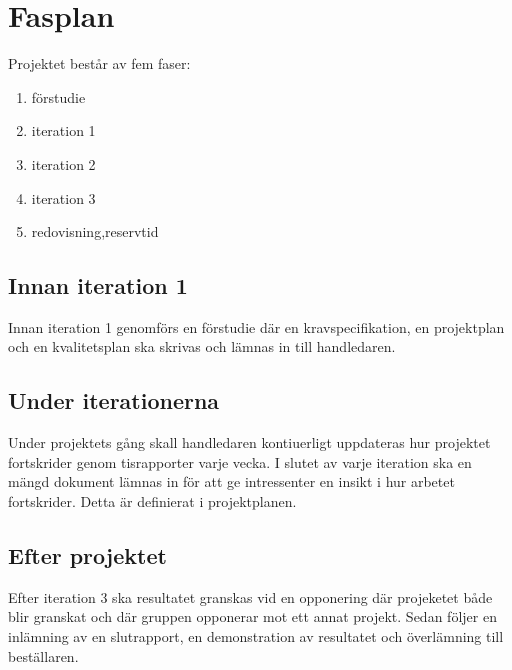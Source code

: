 \section{Fasplan}
Projektet består av fem faser:
\begin{enumerate}
\item förstudie
\item iteration 1
\item iteration 2
\item iteration 3
\item redovisning,reservtid
\end{enumerate}

\subsection{Innan iteration 1}
Innan iteration 1 genomförs en förstudie där en  kravspecifikation, en projektplan och en kvalitetsplan ska skrivas och lämnas in till handledaren. 

\subsection{Under iterationerna}
Under projektets gång skall handledaren kontiuerligt uppdateras hur projektet fortskrider genom tisrapporter varje vecka. I slutet av varje iteration ska en mängd dokument lämnas in för att ge intressenter en insikt i hur arbetet fortskrider. Detta är definierat i projektplanen. 

\subsection{Efter projektet}
Efter iteration 3 ska resultatet granskas vid en opponering där projeketet både blir granskat och där gruppen opponerar mot ett annat projekt. Sedan följer en inlämning av en slutrapport, en demonstration av resultatet och överlämning till beställaren. 